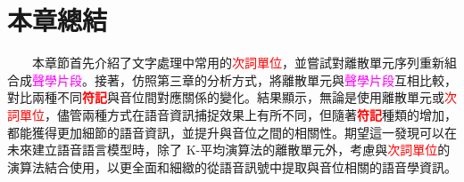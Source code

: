 \section{本章總結}

　　本章節首先介紹了文字處理中常用的\textcolor{red}{次詞單位}，並嘗試對離散單元序列重新組合成\textcolor{magenta}{聲學片段}。接著，仿照第三章的分析方式，將離散單元與\textcolor{magenta}{聲學片段}互相比較，對比兩種不同\textbf{\textcolor{red}{符記}}與音位間對應關係的變化。結果顯示，無論是使用離散單元或\textcolor{red}{次詞單位}，儘管兩種方式在語音資訊捕捉效果上有所不同，但隨著\textbf{\textcolor{red}{符記}}種類的增加，都能獲得更加細節的語音資訊，並提升與音位之間的相關性。期望這一發現可以在未來建立語音語言模型時，除了 K-平均演算法的離散單元外，考慮與\textcolor{red}{次詞單位}的演算法結合使用，以更全面和細緻的從語音訊號中提取與音位相關的語音學資訊。
